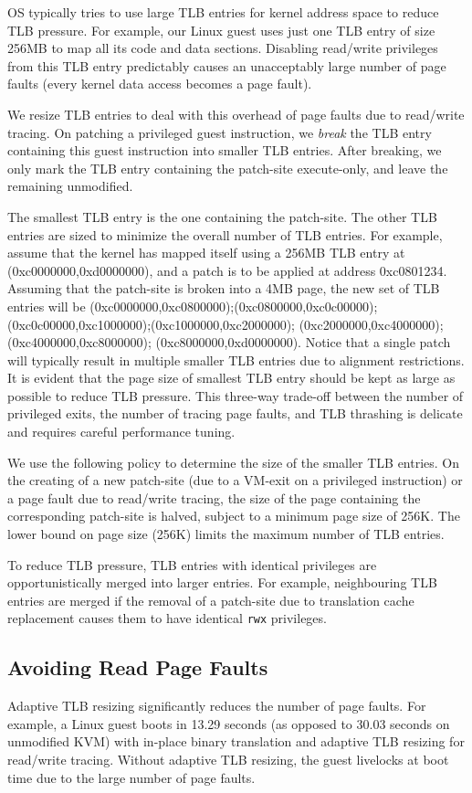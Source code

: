 \documentclass[10pt,twocolumn]{article}
\begin{document}
OS typically tries to use large TLB entries for kernel address space to
reduce TLB pressure. For example, our Linux guest
uses just one TLB entry of size 256MB to map all its code and data sections.
Disabling read/write privileges from this TLB entry predictably causes an unacceptably
large number of page faults (every kernel data access becomes a page fault).

We resize TLB entries to deal with this overhead of page faults due to read/write
tracing. On patching a privileged guest instruction, we {\em break} the TLB entry
containing this guest instruction into smaller TLB entries. After breaking,
we only mark the
TLB entry containing the patch-site execute-only, and leave the remaining
unmodified.

The smallest TLB entry
is the one containing the patch-site. The other TLB entries are sized to minimize
the overall number of TLB entries. For example, assume that the kernel has mapped
itself using a 256MB TLB entry at (0xc0000000,0xd0000000), and a
patch is to be applied at address 0xc0801234. Assuming that the patch-site is broken
into a 4MB page, the new set of TLB entries will be
(0xc0000000,0xc0800000);(0xc0800000,0xc0c00000);
(0xc0c00000,0xc1000000);(0xc1000000,0xc2000000);
(0xc2000000,0xc4000000);(0xc4000000,0xc8000000);
(0xc8000000,0xd0000000). Notice that a single patch will typically result
in multiple smaller TLB entries due to alignment restrictions.
It is evident that the page size of smallest TLB entry should be kept as large
as possible to reduce
TLB pressure. This three-way trade-off between the number of
privileged exits, the number of tracing page faults, and TLB thrashing is
delicate and requires careful performance tuning.

We use the following policy to determine the size of the smaller TLB entries. On the
creating of a new patch-site (due to a VM-exit on a privileged instruction) or a
page fault due to read/write tracing,
the size of the page
containing the corresponding patch-site is halved, subject to
a minimum page size of 256K.
The lower bound on page size (256K) limits the maximum number of TLB entries.

To reduce TLB pressure, TLB entries with identical privileges are
opportunistically merged into
larger entries. For example, neighbouring TLB entries are merged if the
removal of a patch-site due to translation cache replacement causes
them to have identical {\tt rwx} privileges.

\subsection{Avoiding Read Page Faults}
Adaptive TLB resizing significantly reduces the number of page faults. For
example, a Linux guest boots in 13.29 seconds (as opposed to 30.03 seconds on
unmodified KVM) with in-place binary translation
and adaptive TLB resizing for read/write tracing. Without adaptive TLB resizing,
the guest livelocks at boot time due to the large number of
page faults.
\end{document}
